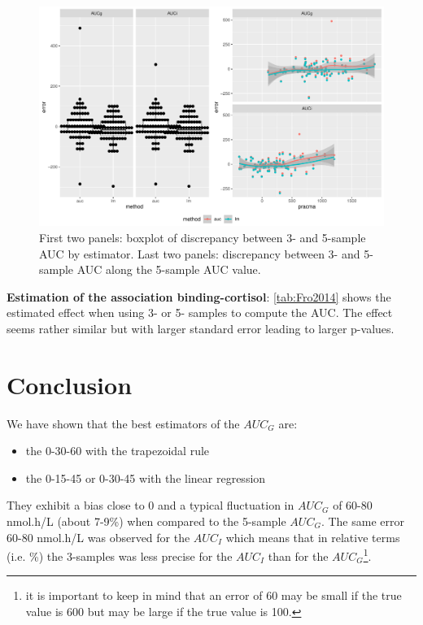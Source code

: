 \documentclass[12pt]{article}
\begin{document}
\begin{figure}[!h]
\centering
\includegraphics[width=1\textwidth]{./figures/gg-fro-errorAUC.pdf}
\caption{\label{fig:fro-errorAUC}First two panels: boxplot of discrepancy between 3- and 5-sample AUC by estimator. Last two panels: discrepancy between 3- and 5-sample AUC along the 5-sample AUC value.}
\end{figure}

\textbf{Estimation of the association binding-cortisol}: \autoref{tab:Fro2014}
shows the estimated effect when using 3- or 5- samples to compute the
AUC. The effect seems rather similar but with larger standard error
leading to larger p-values.

\clearpage

\section{Conclusion}
\label{sec:org584de6d}

We have shown that the best estimators of the \(AUC_G\) are:
\begin{itemize}
\item the 0-30-60 with the trapezoidal rule
\item the 0-15-45 or 0-30-45 with the linear regression
\end{itemize}
They exhibit a bias close to 0 and a typical fluctuation in \(AUC_G\)
of 60-80 nmol.h/L (about 7-9\%) when compared to the 5-sample
\(AUC_G\). The same error 60-80 nmol.h/L was observed for the
\(AUC_I\) which means that in relative terms (i.e. \%) the 3-samples
was less precise for the \(AUC_I\) than for the \(AUC_G\)\footnote{it is important to keep in mind that an error of 60 may be
small if the true value is 600 but may be large if the true value
is 100.}.
\end{document}
